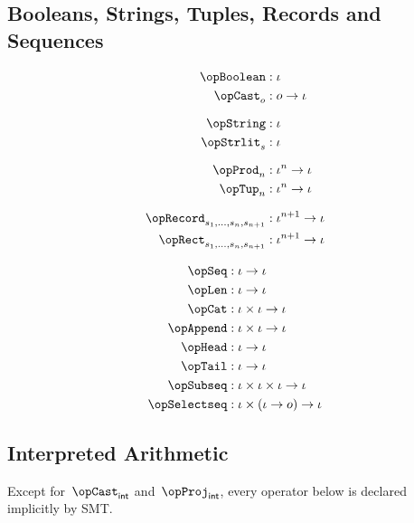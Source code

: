 \documentclass[11pt, a4paper, oneside]{article}
\begin{document}
    \subsection{Booleans, Strings, Tuples, Records and Sequences}

\begin{minipage}[t]{.5\textwidth}
    \begin{align*}
        \opBoolean      &: \idv \\
        \opCast_o       &: o \arr \idv \\[7pt]
        \opString       &: \idv \\
        \opStrlit_s     &: \idv \\[7pt]
        \opProd_n       &: \idv^n \arr \idv \\
        \opTup_n        &: \idv^n \arr \idv \\[7pt]
        \opRecord_{s_1,\dots,s_n,s_{n+1}} &: \idv^{n+1} \arr \idv \\
        \opRect_{s_1,\dots,s_n,s_{n+1}}   &: \idv^{n+1} \arr \idv \\
    \end{align*}
\end{minipage}%
\begin{minipage}[t]{.5\textwidth}
    \begin{align*}
        \opSeq          &: \idv \arr \idv \\
        \opLen          &: \idv \arr \idv \\
        \opCat          &: \idv \times \idv \arr \idv \\
        \opAppend       &: \idv \times \idv \arr \idv \\
        \opHead         &: \idv \arr \idv \\
        \opTail         &: \idv \arr \idv \\
        \opSubseq       &: \idv \times \idv \times \idv \arr \idv \\
        \opSelectseq    &: \idv \times (\idv \arr o) \arr \idv
    \end{align*}
\end{minipage}


    \subsection{Interpreted Arithmetic}

Except for~$\opCast_\int$ and~$\opProj_\int$, every operator below is declared implicitly by SMT.
\end{document}

